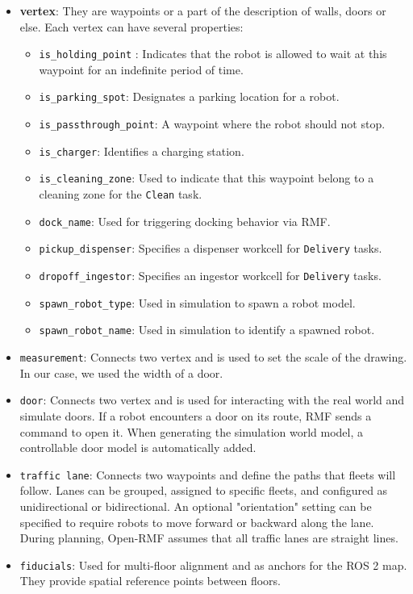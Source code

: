 \begin{itemize}
	\item \textbf{vertex}: They are waypoints or a part of the description of walls, doors or else. Each vertex can have several properties:
	\begin{itemize}
		\item \texttt{is\_holding\_point} : Indicates that the robot is allowed to wait at this waypoint for an indefinite period of time.
		\item \texttt{is\_parking\_spot}: Designates a parking location for a robot.
		\item \texttt{is\_passthrough\_point}: A waypoint where the robot should not stop.
		\item \texttt{is\_charger}: Identifies a charging station.
		\item \texttt{is\_cleaning\_zone}: Used to indicate that this waypoint belong to a cleaning zone for the \texttt{Clean} task.
		\item \texttt{dock\_name}: Used for triggering docking behavior via RMF.
		\item \texttt{pickup\_dispenser}: Specifies a dispenser workcell for \texttt{Delivery} tasks.
		\item \texttt{dropoff\_ingestor}: Specifies an ingestor workcell for \texttt{Delivery} tasks.
		\item \texttt{spawn\_robot\_type}: Used in simulation to spawn a robot model.
		\item \texttt{spawn\_robot\_name}: Used in simulation to identify a spawned robot.
	\end{itemize}
	\item \texttt{measurement}: Connects two vertex and is used to set the scale of the drawing. In our case, we used the width of a door.
	\item \texttt{door}: Connects two vertex and is used for interacting with the real world and simulate doors. If a robot encounters a door on its route, RMF sends a command to open it. When generating the simulation world model, a controllable door model is automatically added.
	\item \texttt{traffic lane}: Connects two waypoints and define the paths that fleets will follow. Lanes can be grouped, assigned to specific fleets, and configured as unidirectional or bidirectional. An optional "orientation" setting can be specified to require robots to move forward or backward along the lane. During planning, Open-RMF assumes that all traffic lanes are straight lines.
	\item \texttt{fiducials}: Used for multi-floor alignment and as anchors for the ROS 2 map. They provide spatial reference points between floors.

\end{itemize}
